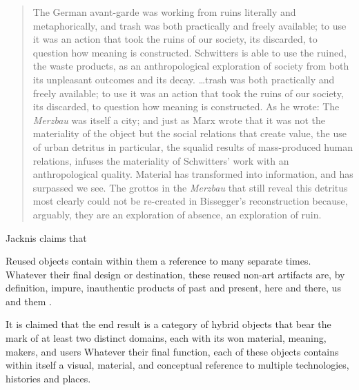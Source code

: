 \begin{quote}
The German avant-garde was working from ruins literally and metaphorically, and trash was both practically and freely available; to use it was an action that took the ruins of our society, its discarded, to question how meaning is constructed. Schwitters is able to use the ruined, the waste products, as an anthropological exploration of society from both its unpleasant outcomes and its decay. \ldots trash was both practically and freely available; to use it was an action that took the ruins of our society, its discarded, to question how meaning is constructed. As he wrote:  The \textit{Merzbau} was itself a city; and just as Marx wrote that it was not the materiality of the object but the social relations that create value, the use of urban detritus in particular, the squalid results of mass-produced human relations, infuses the materiality of Schwitters’ work with an anthropological quality. Material has transformed into information, and  has surpassed  we see. The grottos in the \textit{Merzbau} that still reveal this detritus most clearly could not be re-created in Bissegger’s reconstruction because, arguably, they are an exploration of absence, an exploration of ruin.
\end{quote}

Jacknis \citep[as cited in][]{cerny1996recycled} claims that 

Reused objects contain within them a reference to many separate times. Whatever their final design or destination, these reused non-art artifacts are, by definition, impure, inauthentic products of past and present, here and there, us and them \citep{cerny1996recycled}.

It is claimed that the end result is a category of hybrid objects that bear the mark of at least two distinct domains, each with its won material, meaning, makers, and users \citep{cerny1996recycled} Whatever their final function, each of these objects contains within itself a visual, material, and conceptual reference to multiple technologies, histories and places.

